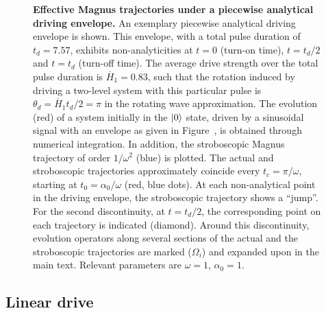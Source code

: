 \begin{figure}[tb]
	\caption{\textbf{Effective Magnus trajectories under a piecewise analytical driving envelope.}  An exemplary piecewise analytical driving envelope is shown. This envelope, with a total pulse duration of $t_d = 7.57$, exhibits non-analyticities at $t=0$ (turn-on time), $t=t_d/2$ and $t=t_d$ (turn-off time). The average drive strength over the total pulse duration is $\overline{H}_1 = 0.83$, such that the rotation induced by driving a two-level system with this particular pulse is $\theta_d = \overline{H}_1t_d/2=\pi$ in the rotating wave approximation.  The evolution (red) of a system initially in the $\ket{0}$ state, driven by a sinusoidal signal with an envelope as given in Figure~, is obtained through numerical integration. In addition, the stroboscopic Magnus trajectory of order $1/\omega^2$ (blue) is plotted. The actual and stroboscopic trajectories approximately coincide every $t_c=\pi / \omega$, starting at $t_0 = \alpha_0/\omega$ (red, blue dots). At each non-analytical point in the driving envelope, the stroboscopic trajectory shows a ``jump''. For the second discontinuity, at $t = t_d/2$, the corresponding point on each trajectory is indicated (diamond). Around this discontinuity, evolution operators along several sections of the actual and the stroboscopic trajectories are marked ($\Omega_i$) and expanded upon in the main text. Relevant parameters are $\omega = 1$, $\alpha_0 = 1$. }
	\label{fig:jumpop-trace}
\end{figure}

\subsection{Linear drive}


\printbibliography
	
